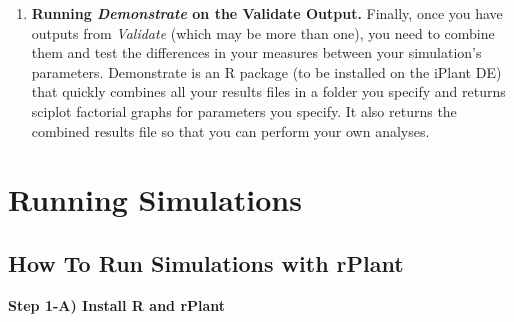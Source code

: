 \documentclass[twoside,a4paper]{refart}
\begin{document}
\begin{enumerate}
\vspace{-1.3mm}
\item \textbf{Running \textit{Demonstrate} on the Validate Output.}
Finally, once you have outputs from \textit{Validate} (which may be more than one), you need to combine them and test the differences in your measures between your simulation's parameters. Demonstrate is an R package (to be installed on the iPlant DE) that quickly combines all your results files in a folder you specify and returns sciplot factorial graphs for parameters you specify. It also returns the combined results file so that you can perform your own analyses.
\end{enumerate}

\newpage
\section{Running Simulations}


\subsection{How To Run Simulations with rPlant}

\textbf{Step 1-A) Install R and rPlant}
\end{document}

